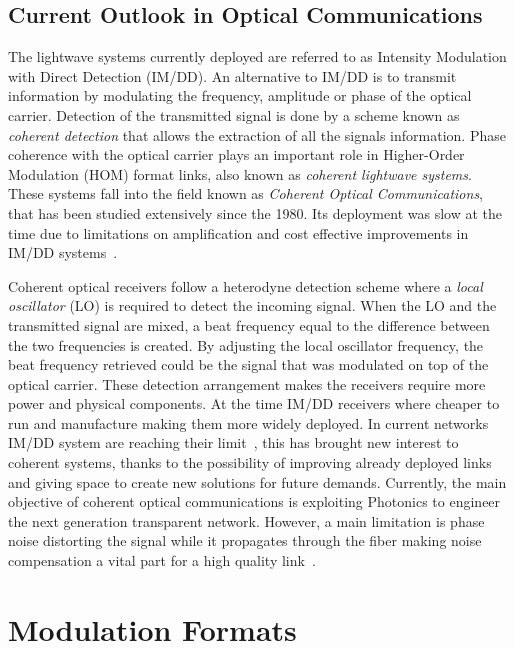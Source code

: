 \subsection{Current Outlook in Optical Communications}


The lightwave systems currently deployed are referred to as Intensity Modulation with Direct Detection (IM/DD). An alternative to IM/DD is to transmit information by modulating the frequency, amplitude or  phase of the optical carrier. Detection of the transmitted signal is done by a scheme known as \textit{coherent detection} that allows the extraction of all the signals information. Phase coherence with the optical carrier plays an important role in Higher-Order Modulation (HOM) format links, also known as \textit{coherent lightwave systems}. These systems fall into the field known as  \textit{Coherent Optical Communications}, that has been studied extensively since the 1980. Its deployment was slow at the time due to limitations on amplification and cost effective improvements in IM/DD systems~\cite{FiberAgrawal,NetGenTransp}.

 Coherent optical receivers follow a heterodyne detection scheme where a \textit{local oscillator} (LO) is required to detect the incoming signal.
When the LO and the transmitted signal are mixed, a beat frequency equal to the difference between the two frequencies is created. By adjusting the local oscillator frequency, the beat frequency retrieved could be the signal that was modulated on top of the optical carrier. These detection arrangement makes the receivers require more power and physical components. At the time IM/DD receivers where cheaper to run and manufacture making them more widely deployed. In current networks IM/DD system are reaching their limit~\cite{COChistory}, this has brought new interest to coherent systems, thanks to the possibility of improving already deployed links and giving space to create new solutions for future demands. Currently, the main objective of coherent optical communications is exploiting Photonics to engineer the next generation transparent network. However, a main limitation is phase noise distorting the signal while it propagates through the fiber making noise compensation a vital part for a high quality link~\cite{behrens2010nonlinear}.

\section{ Modulation Formats }
 
